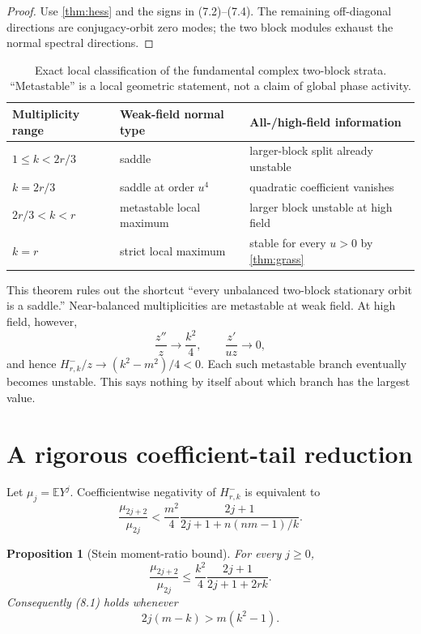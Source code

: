 \documentclass[11pt]{article}
\newtheorem{proposition}[theorem]{Proposition}
\newcommand{\E}{\mathbb E}
\begin{document}
\begin{proof}
Use \cref{thm:hess} and the signs in (7.2)--(7.4).  The remaining
off-diagonal directions are conjugacy-orbit zero modes; the two block
modules exhaust the normal spectral directions.
\end{proof}

\begin{table}[H]
\centering
\small
\begin{tabular}{@{}lll@{}}
\toprule
Multiplicity range & Weak-field normal type & All-/high-field information \\
\midrule
$1\le k<2r/3$ & saddle & larger-block split already unstable \\
$k=2r/3$ & saddle at order $u^4$ & quadratic coefficient vanishes \\
$2r/3<k<r$ & metastable local maximum & larger block unstable at high field \\
$k=r$ & strict local maximum & stable for every $u>0$ by \cref{thm:grass} \\
\bottomrule
\end{tabular}
\caption{Exact local classification of the fundamental complex two-block
strata.  ``Metastable'' is a local geometric statement, not a claim of
global phase activity.}
\label{tab:stability}
\end{table}

This theorem rules out the shortcut ``every unbalanced two-block stationary
orbit is a saddle.''  Near-balanced multiplicities are metastable at weak
field.  At high field, however,
\[
 \frac{z''}{z}\longrightarrow\frac{k^2}{4},\qquad
 \frac{z'}{uz}\longrightarrow0,
\]
and hence $H_{r,k}^{-}/z\to(k^2-m^2)/4<0$.  Each such metastable branch
eventually becomes unstable.  This says nothing by itself about which branch
has the largest value.

\section{A rigorous coefficient-tail reduction}

Let $\mu_j=\E Y^j$.  Coefficientwise negativity of $H_{r,k}^{-}$ is
equivalent to
\[
 \frac{\mu_{2j+2}}{\mu_{2j}}
 <\frac{m^2}{4}\frac{2j+1}{2j+1+n(nm-1)/k}.                 \tag{8.1}
\]

\begin{proposition}[Stein moment-ratio bound]\label{prop:tail}
For every $j\ge0$,
\[
 \frac{\mu_{2j+2}}{\mu_{2j}}
 \le\frac{k^2}{4}\frac{2j+1}{2j+1+2rk}.                    \tag{8.2}
\]
Consequently (8.1) holds whenever
\[
 2j(m-k)>m(k^2-1).                                          \tag{8.3}
\]
\end{proposition}
\end{document}

